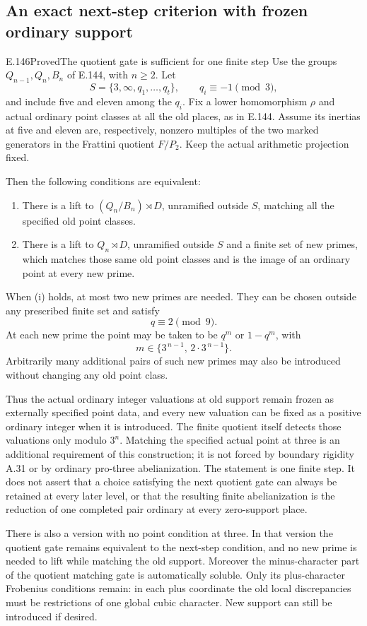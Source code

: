 \subsection{An exact next-step criterion with frozen ordinary support}

\begin{result}{E.146}{Proved}{The quotient gate is sufficient for one finite step}
Use the groups \(Q_{n-1},Q_n,B_n\) of E.144, with
\(n\ge2\). Let
\[
 S=\{3,\infty,q_1,\ldots,q_t\},\qquad
 q_i\equiv-1\pmod3,
\]
and include five and eleven among the \(q_i\).
Fix a lower homomorphism \(\rho\) and actual ordinary
point classes at all the old places, as in E.144.
Assume its inertias at five and eleven are,
respectively, nonzero multiples of the two marked
generators in the Frattini quotient \(F/P_2\).
Keep the actual arithmetic projection fixed.

Then the following conditions are equivalent:
\begin{enumerate}[label=(\roman*)]
\item There is a lift to \((Q_n/B_n)\rtimes D\),
unramified outside \(S\), matching all the specified
old point classes.
\item There is a lift to \(Q_n\rtimes D\), unramified
outside \(S\) and a finite set of new primes, which
matches those same old point classes and is the
image of an ordinary point at every new prime.
\end{enumerate}
When (i) holds, at most two new primes are needed.
They can be chosen outside any prescribed finite
set and satisfy
\[
                         q\equiv2\pmod9.
 \tag{E.146.1}
\]
At each new prime the point may be taken to be
\(q^m\) or \(1-q^m\), with
\[
              m\in\{3^{\,n-1},\,2\cdot3^{\,n-1}\}.
 \tag{E.146.2}
\]
Arbitrarily many additional pairs of such new primes
may also be introduced without changing any old
point class.

Thus the actual ordinary integer valuations at old
support remain frozen as externally specified point
data, and every new valuation can
be fixed as a positive ordinary integer when it is
introduced. The finite quotient itself detects those
valuations only modulo \(3^n\).
Matching the specified actual point at three is an
additional requirement of this construction; it is
not forced by boundary rigidity A.31 or by ordinary
pro-three abelianization.
The statement is one finite step. It
does not assert that a choice satisfying the next
quotient gate can always be retained at every later
level, or that the resulting finite abelianization
is the reduction of one completed pair ordinary at
every zero-support place.

There is also a version with no point condition at
three. In that version the quotient gate remains
equivalent to the next-step condition, and no new
prime is needed to lift while matching the old
support. Moreover the minus-character part of
the quotient matching gate is automatically
soluble. Only its plus-character Frobenius
conditions remain: in each plus coordinate
the old local discrepancies must be restrictions
of one global cubic character. New support
can still be introduced if desired.
\end{result}
